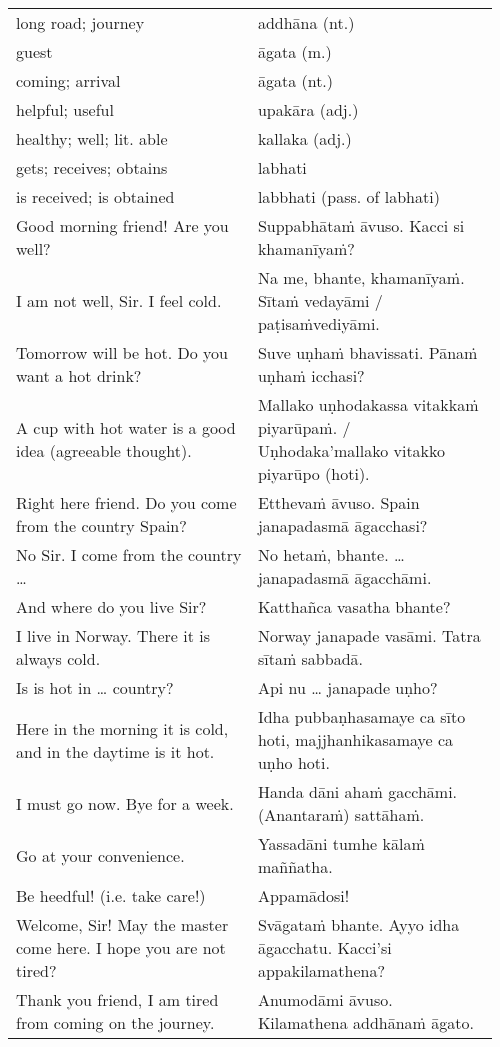 \documentclass[a5paper]{memoir}
\begin{document}
\begin{longtable}{L{0.48\linewidth} L{0.48\linewidth}}
long road; journey & addhāna (nt.)\\[0pt]
guest & āgata (m.)\\[0pt]
coming; arrival & āgata (nt.)\\[0pt]
helpful; useful & upakāra (adj.)\\[0pt]
healthy; well; lit. able & kallaka (adj.)\\[0pt]
gets; receives; obtains & labhati\\[0pt]
is received; is obtained & labbhati (pass. of labhati)\\[0pt]
Good morning friend! Are you well? & Suppabhātaṁ āvuso. Kacci si khamanīyaṁ?\\[0pt]
I am not well, Sir. I feel cold. & Na me, bhante, khamanīyaṁ. Sītaṁ vedayāmi / paṭisaṁvediyāmi.\\[0pt]
Tomorrow will be hot. Do you want a hot drink? & Suve uṇhaṁ bhavissati. Pānaṁ uṇhaṁ icchasi?\\[0pt]
A cup with hot water is a good idea (agreeable thought). & Mallako uṇhodakassa vitakkaṁ piyarūpaṁ. / Uṇhodaka'mallako vitakko piyarūpo (hoti).\\[0pt]
Right here friend. Do you come from the country Spain? & Etthevaṁ āvuso. Spain janapadasmā āgacchasi?\\[0pt]
No Sir. I come from the country \ldots{} & No hetaṁ, bhante. \ldots{} janapadasmā āgacchāmi.\\[0pt]
And where do you live Sir? & Katthañca vasatha bhante?\\[0pt]
I live in Norway. There it is always cold. & Norway janapade vasāmi. Tatra sītaṁ sabbadā.\\[0pt]
Is is hot in \ldots{} country? & Api nu \ldots{} janapade uṇho?\\[0pt]
Here in the morning it is cold, and in the daytime is it hot. & Idha pubbaṇhasamaye ca sīto hoti, majjhanhikasamaye ca uṇho hoti.\\[0pt]
I must go now. Bye for a week. & Handa dāni ahaṁ gacchāmi. (Anantaraṁ) sattāhaṁ.\\[0pt]
Go at your convenience. & Yassadāni tumhe kālaṁ maññatha.\\[0pt]
Be heedful! (i.e. take care!) & Appamādosi!\\[0pt]
Welcome, Sir! May the master come here. I hope you are not tired? & Svāgataṁ bhante. Ayyo idha āgacchatu. Kacci'si appakilamathena?\\[0pt]
Thank you friend, I am tired from coming on the journey. & Anumodāmi āvuso. Kilamathena addhānaṁ āgato.\\[0pt]

\end{longtable}
\end{document}
